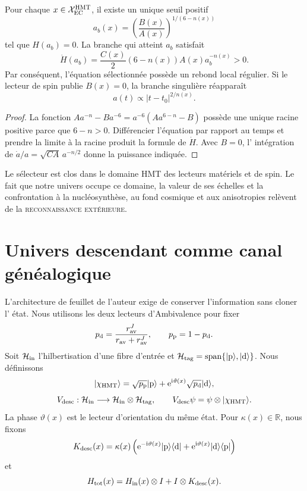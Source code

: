 \begin{theorem}
\label{thm:hmtf2-rebote-ec}
Pour chaque \(x\in\mathcal X_{\rm EC}^{\rm HMT}\), il existe un unique seuil
positif
\[
 a_b(x)
 =\left(\frac{B(x)}{A(x)}\right)^{1/(6-n(x))}
\]
tel que \(H(a_b)=0\). La branche qui atteint \(a_b\) satisfait
\[
 \dot H(a_b)
 =\frac{C(x)}2(6-n(x))A(x)a_b^{-n(x)}>0.
\]
Par conséquent, l'équation sélectionnée possède un rebond local régulier. Si le
lecteur de spin publie \(B(x)=0\), la branche singulière réapparaît
\[
 a(t)\propto|t-t_0|^{2/n(x)}.
\]
\end{theorem}

\begin{proof}
La fonction
\(A a^{-n}-B a^{-6}=a^{-6}(Aa^{6-n}-B)\) possède une unique racine positive
parce que \(6-n>0\). Différencier l'équation par rapport au temps et prendre la
limite à la racine produit la formule de \(\dot H\). Avec \(B=0\), l'
intégration de \(\dot a/a=\sqrt{CA}\,a^{-n/2}\) donne la puissance indiquée.
\end{proof}

Le sélecteur est clos dans le domaine HMT des lecteurs matériels et de
spin. Le fait que notre univers occupe ce domaine, la valeur de ses échelles et la
confrontation à la nucléosynthèse, au fond cosmique et aux anisotropies relèvent de la
\textsc{reconnaissance extérieure}.

\section{Univers descendant comme canal généalogique}
\label{sec:hmtf2-universo-descendiente}

L'architecture de feuillet de l'auteur exige de conserver l'information sans cloner l'
état. Nous utilisons les deux lecteurs d'Ambivalence pour fixer
\[
 p_{\rm d}
 =\frac{r_{\rm av}^J}{r_{\rm av}+r_{\rm av}^J},
 \qquad
 p_{\rm p}=1-p_{\rm d}.
\]
Soit \(\mathcal H_{\rm in}\) l'hilbertisation d'une fibre d'entrée et
\(\mathcal H_{\rm tag}=\operatorname{span}\{|{\rm p}\rangle,|{\rm d}\rangle\}\).
Nous définissons
\[
 |\chi_{\rm HMT}\rangle
 =\sqrt{p_{\rm p}}|{\rm p}\rangle
 +\mathrm e^{{\rm i}\vartheta(x)}
  \sqrt{p_{\rm d}}|{\rm d}\rangle,
\]
\[
 V_{\rm desc}:\mathcal H_{\rm in}
 \longrightarrow\mathcal H_{\rm in}\otimes\mathcal H_{\rm tag},
 \qquad
 V_{\rm desc}\psi=\psi\otimes|\chi_{\rm HMT}\rangle.
\]
La phase \(\vartheta(x)\) est le lecteur d'orientation du même état. Pour
\(\kappa(x)\in\mathbb R\), nous fixons
\[
 K_{\rm desc}(x)
 =\kappa(x)
 \left(
 \mathrm e^{-{\rm i}\vartheta(x)}
 |{\rm p}\rangle\langle{\rm d}|
 +\mathrm e^{{\rm i}\vartheta(x)}
 |{\rm d}\rangle\langle{\rm p}|
 \right)
\]
et
\[
 H_{\rm tot}(x)
 =H_{\rm in}(x)\otimes I+I\otimes K_{\rm desc}(x).
\]

